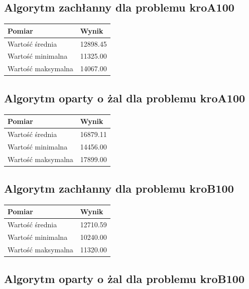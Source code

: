 \documentclass[a4paper]{article}
\begin{document}
\subsection{Algorytm zachłanny dla problemu kroA100}

\begin{center}
	\begin{tabular}{ l | l }
		\textbf{Pomiar} & \textbf{Wynik} \\
		\hline
		Wartość średnia    & 12898.45 \\
		Wartość minimalna  & 11325.00 \\
		Wartość maksymalna & 14067.00 \\
	\end{tabular}
\end{center}

\subsection{Algorytm oparty o żal dla problemu kroA100}

\begin{center}
	\begin{tabular}{ l | l }
		\textbf{Pomiar} & \textbf{Wynik} \\
		\hline
		Wartość średnia    & 16879.11 \\
		Wartość minimalna  & 14456.00 \\
		Wartość maksymalna & 17899.00 \\
	\end{tabular}
\end{center}

\subsection{Algorytm zachłanny dla problemu kroB100}

\begin{center}
	\begin{tabular}{ l | l }
		\textbf{Pomiar} & \textbf{Wynik} \\
		\hline
		Wartość średnia    & 12710.59 \\
		Wartość minimalna  & 10240.00 \\
		Wartość maksymalna & 11320.00 \\
	\end{tabular}
\end{center}

\subsection{Algorytm oparty o żal dla problemu kroB100}
\end{document}
